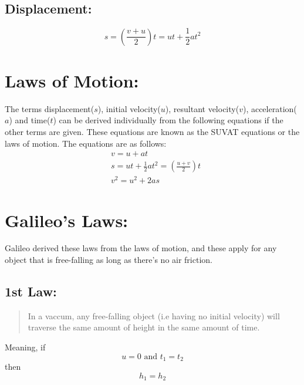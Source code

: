 \documentclass[a4paper]{report}
\begin{document}
        \subsection{Displacement: }
            \begin{equation}
                s = (\frac{v + u}{2}) t = ut + \frac{1}{2}at^2
            \end{equation}
    \section{Laws of Motion: }
        The terms displacement($s$), initial velocity($u$), resultant velocity($v$), acceleration($a$) and time($t$) can be derived individually from the following equations if the other terms are given. These equations are known as the SUVAT equations or the laws of motion. The equations are as follows:
        \\
        \begin{eqnarray}
            &v = u + at \\
            &s = ut + \frac{1}{2}at^2 = (\frac{u + v}{2})t \\
            &v^2 = u^2 + 2as
        \end{eqnarray}
    \section{Galileo's Laws: }
        Galileo derived these laws from the laws of motion, and these apply for any object that is free-falling as long as there's no air friction.
        \subsection{1st Law: }
            \begin{quotation}
                \item In a vaccum, any free-falling object (i.e having no initial velocity) will traverse the same amount of height in the same amount of time.
            \end{quotation}
            Meaning, if \\
            \begin{equation*}
                u = 0 \textrm{ and } t_1 = t_2
            \end{equation*}
            then \\
            \begin{equation}
                h_1 = h_2
            \end{equation}
\end{document}
